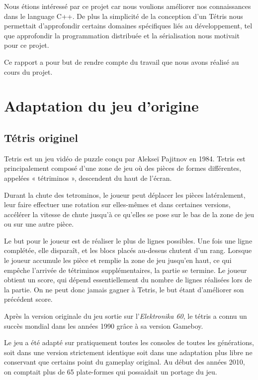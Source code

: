 \documentclass[a4paper, 12pt]{article}
\begin{document}
	\bigskip
	Nous étions intéressé par ce projet car nous voulions améliorer nos connaissances dans le language C++. De plus la simplicité de la conception d'un Tétris nous permettait d'approfondir certains domaines spécifiques liés au développement, tel que approfondir la programmation distribuée et la sérialisation nous motivait pour ce projet.

	\bigskip
	Ce rapport a pour but de rendre compte du travail que nous avons réalisé au cours du projet.

	\newpage

\section{Adaptation du jeu d'origine}
	\subsection{Tétris originel}
		Tetris est un jeu vidéo de puzzle conçu par Alekseï Pajitnov en 1984. Tetris est principalement composé d'une zone de jeu où des pièces de formes différentes, appelées « tétriminos », descendent du haut de l'écran. 
		
		Durant la chute des tetrominos, le joueur peut déplacer les pièces latéralement, leur faire effectuer une rotation sur elles-mêmes et dans certaines versions, accélérer la vitesse de chute jusqu'à ce qu'elles se pose sur le bas de la zone de jeu ou sur une autre pièce. 
		
		Le but pour le joueur est de réaliser le plus de lignes possibles. Une fois une ligne complétée, elle disparaît, et les blocs placés au-dessus chutent d'un rang. 
		Lorsque le joueur accumule les pièce et remplie la zone de jeu jusqu’en haut, ce qui empêche l'arrivée de tétriminos supplémentaires, la partie se termine. Le joueur obtient un score, qui dépend essentiellement du nombre de lignes réalisées lors de la partie. On ne peut donc jamais gagner à Tetris, le but étant d’améliorer son précédent score.

		Après la version originale du jeu sortie sur l'\textit{Elektronika 60}, le tétris a connu un succès mondial dans les années 1990 grâce à sa version Gameboy.

		Le jeu a été adapté sur pratiquement toutes les consoles de toutes les générations, soit dans une version strictement identique soit dans une adaptation plus libre ne conservant que certains point du gameplay original. Au début des années 2010, on comptait plus de 65 plate-formes qui possaidait un portage du jeu.
\end{document}
